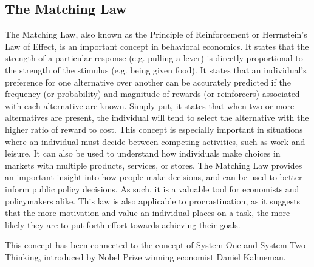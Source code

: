 \subsection{The Matching Law}

The Matching Law, also known as the Principle of Reinforcement or Herrnstein's Law of Effect,
is an important concept in behavioral economics.
It states that the strength of a particular response (e.g. pulling a lever)
is directly proportional to the strength of the stimulus (e.g. being given food).
It states that an individual's preference for one alternative over another can be accurately predicted
if the frequency (or probability) and magnitude of rewards (or reinforcers) associated with each
alternative are known.
Simply put, it states that when two or more alternatives are present, the individual will tend to select
the alternative with the higher ratio of reward to cost.
This concept is especially important in situations where an individual must decide between competing activities, such as work and leisure. 
It can also be used to understand how individuals make choices in markets with multiple products, services, or stores. 
The Matching Law provides an important insight into how people make decisions, and can be used to better inform public policy decisions. As such, it is a valuable tool for economists and policymakers alike.
This law is also applicable to procrastination,
as it suggests that the more motivation and value an individual places on a task,
the more likely they are to put forth effort towards achieving their goals.\cite{Poling2011Apr}

This concept has been connected to the concept of System One and System Two Thinking,
introduced by Nobel Prize winning economist Daniel Kahneman.







